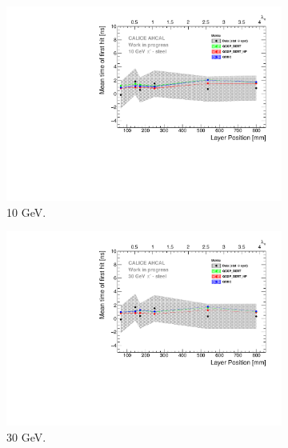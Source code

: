 \begin{figure}[htbp!]
  \begin{subfigure}[t]{0.5\textwidth}
    \centering
    \includegraphics[width=1\textwidth]{../Thesis_Plots/Timing/Pions/Plots/ComparisonToSim/Time_Depth_10GeV_Mokka.pdf}
    \caption{10 GeV.}\label{fig:Depth_SimData_10GeV}
  \end{subfigure}
  \hfill
  \begin{subfigure}[t]{0.5\textwidth}
    \centering
    \includegraphics[width=1\textwidth]{../Thesis_Plots/Timing/Pions/Plots/ComparisonToSim/Time_Depth_30GeV_Mokka.pdf}
    \caption{30 GeV.} \label{fig:Depth_SimData_30GeV}
  \end{subfigure}
  \hfill
  \begin{subfigure}[t]{0.5\textwidth}
    \centering

\end{subfigure}
\end{figure}
